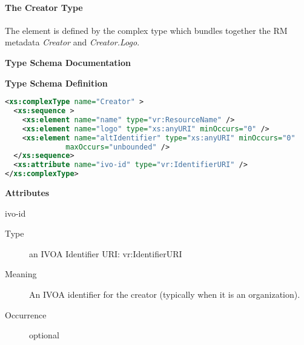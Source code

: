 \documentclass[11pt,a4paper]{ivoa}
\begin{document}


\paragraph{The Creator Type}

The  element is defined by the  complex
type which bundles together the RM metadata \emph{Creator} and
\emph{Creator.Logo}.



\begin{generated}
\begingroup
        \renewcommand*\descriptionlabel[1]{%
        \hbox to 5.5em{\emph{#1}\hfil}}\vspace{2ex}\noindent\textbf{ Type Schema Documentation}


\vspace{1ex}\noindent\textbf{ Type Schema Definition}

\begin{lstlisting}[language=XML,basicstyle=\footnotesize]
<xs:complexType name="Creator" >
  <xs:sequence >
    <xs:element name="name" type="vr:ResourceName" />
    <xs:element name="logo" type="xs:anyURI" minOccurs="0" />
    <xs:element name="altIdentifier" type="xs:anyURI" minOccurs="0"
              maxOccurs="unbounded" />
  </xs:sequence>
  <xs:attribute name="ivo-id" type="vr:IdentifierURI" />
</xs:complexType>
\end{lstlisting}

\vspace{0.5ex}\noindent\textbf{ Attributes}

\begingroup\small\begin{bigdescription}
\item[ivo-id]
\begin{description}
\item[Type] an IVOA Identifier URI: vr:IdentifierURI
\item[Meaning]
             An IVOA identifier for the creator (typically when it is
             an organization).

\item[Occurrence] optional

\end{description}



\end{bigdescription}
\end{generated}
\end{document}
